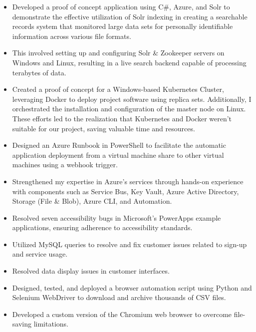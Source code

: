 \documentclass[11pt,sans]{moderncv}
\begin{document}
\newline{}
\begin{itemize}
\item Developed a proof of concept application using C\#, Azure, and Solr to demonstrate the effective utilization of Solr indexing in creating a searchable records system that monitored large data sets for personally identifiable information across various file formats. 
\item This involved setting up and configuring Solr \& Zookeeper servers on Windows and Linux, resulting in a live search backend capable of processing terabytes of data.
\item Created a proof of concept for a Windows-based Kubernetes Cluster, leveraging Docker to deploy project software using replica sets. Additionally, I orchestrated the installation and configuration of the master node on Linux. These efforts led to the realization that Kubernetes and Docker weren't suitable for our project, saving valuable time and resources.
\item Designed an Azure Runbook in PowerShell to facilitate the automatic application deployment from a virtual machine share to other virtual machines using a webhook trigger.
\item Strengthened my expertise in Azure's services through hands-on experience with components such as Service Bus, Key Vault, Azure Active Directory, Storage (File \& Blob), Azure CLI, and Automation.
\item Resolved seven accessibility bugs in Microsoft's PowerApps example applications, ensuring adherence to accessibility standards.\newline{}
\end{itemize}
\newline{}
\begin{itemize}
\item Utilized MySQL queries to resolve and fix customer issues related to sign-up and service usage.
\item Resolved data display issues in customer interfaces.\newline{}
\end{itemize}
\newline{}
\begin{itemize}
\item Designed, tested, and deployed a browser automation script using Python and Selenium WebDriver to download and archive thousands of CSV files.
\item Developed a custom version of the Chromium web browser to overcome file-saving limitations.
\end{itemize}
\end{document}
